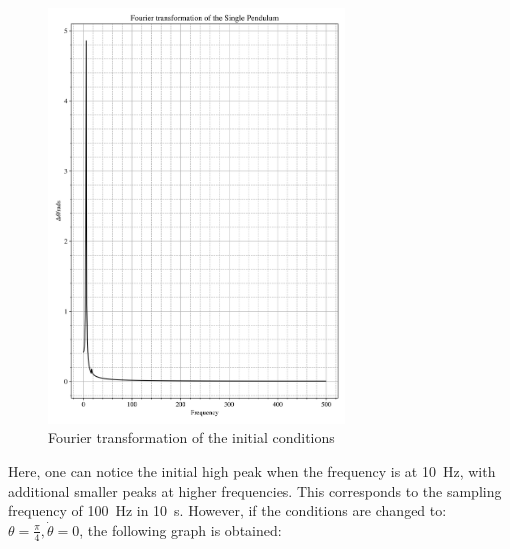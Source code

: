 \documentclass[12pt, a4paper]{article}
\begin{document}
\begin{figure}[H]
    \centering
    \includegraphics[width = 0.7\textwidth]{plots/Plot 2.1.png}\caption{Fourier transformation of the initial conditions}\label{fig: foruier 1.1}
\end{figure}

Here, one can notice the initial high peak when the frequency is at \qty{10}{\hertz}, with additional smaller peaks at higher frequencies. This corresponds to the sampling frequency of \qty{100}{\hertz} in \qty{10}{\second}. However, if the conditions are changed to: \(\theta = \frac{\pi}{4}, \dot{\theta} = 0\), the following graph is obtained:
\end{document}
